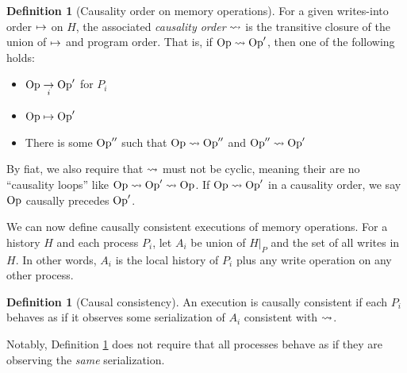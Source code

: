 \documentclass[]             %
{NASA}                       %
\theoremstyle{definition}
\newtheorem{definition}[theorem]{Definition}
\begin{document}
\begin{definition}[Causality order on memory operations]
  \label{def:memorycausalprecedence}
  For a given writes-into order $\mapsto$ on
  $H$, the associated \emph{causality order}
  $\rightsquigarrow$ is the transitive closure of the union of
  $\mapsto$ and program order. That is, if $\mathrm{Op} \rightsquigarrow
  \mathrm{Op}'$, then one of the following holds:
  \begin{itemize}
  \item $\mathrm{Op} \underset{i}{\to} \mathrm{Op}'$ for $P_i$
  \item $\mathrm{Op} \mapsto \mathrm{Op}'$
  \item There is some $\mathrm{Op}''$ such that $\mathrm{Op} \rightsquigarrow \mathrm{Op}''$ and $\mathrm{Op}'' \rightsquigarrow \mathrm{Op}'$
  \end{itemize}
  By fiat, we also require that $\rightsquigarrow$ must not be cyclic,
  meaning their are no ``causality loops'' like
  $\mathrm{Op} \rightsquigarrow \mathrm{Op}' \rightsquigarrow \mathrm{Op}$.  If
  $\mathrm{Op} \rightsquigarrow \mathrm{Op}'$ in a causality order, we say $\mathrm{Op}$
  causally precedes $\mathrm{Op}'$.
\end{definition}

We can now define causally consistent executions of memory
operations. For a history $H$ and each process $P_i$, let $A_i$ be
union of $H|_P$ and the set of all writes in $H$. In other words,
$A_i$ is the local history of $P_i$ plus any write operation on any
other process.

%    
%    

\begin{definition}[Causal consistency]
  \label{def:causalconsistency}
  An execution is causally consistent if each $P_i$ behaves as if it
  observes some serialization of $A_i$ consistent with $\rightsquigarrow$.
\end{definition}

Notably, Definition \ref{def:causalconsistency} does not require that
all processes behave as if they are observing the \emph{same}
serialization.
\end{document}
